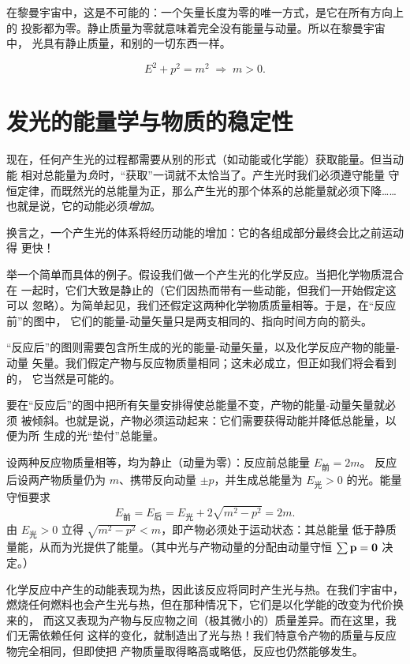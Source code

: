 在黎曼宇宙中，这是不可能的：一个矢量长度为零的唯一方式，是它在所有方向上的
投影都为零。静止质量为零就意味着完全没有能量与动量。所以在黎曼宇宙中，
光具有静止质量，和别的一切东西一样。

\begin{equation}
E^2 + p^2 = m^2 \;\Longrightarrow\; m>0 .
\end{equation}

\section{发光的能量学与物质的稳定性}

现在，任何产生光的过程都需要从别的形式（如动能或化学能）获取能量。但当动能
相对总能量为\emph{负}时，“获取”一词就不太恰当了。产生光时我们必须遵守能量
守恒定律，而既然光的总能量为正，那么产生光的那个体系的总能量就必须下降……
也就是说，它的动能必须\emph{增加}。

换言之，一个产生光的体系将经历动能的增加：它的各组成部分最终会比之前运动得
更快！


举一个简单而具体的例子。假设我们做一个产生光的化学反应。当把化学物质混合在
一起时，它们大致是静止的（它们因热而带有一些动能，但我们一开始假定这可以
忽略）。为简单起见，我们还假定这两种化学物质质量相等。于是，在“反应前”的图中，
它们的能量-动量矢量只是两支相同的、指向时间方向的箭头。

“反应后”的图则需要包含所生成的光的能量-动量矢量，以及化学反应产物的能量-动量
矢量。我们假定产物与反应物质量相同；这未必成立，但正如我们将会看到的，
它当然是可能的。

要在“反应后”的图中把所有矢量安排得使总能量不变，产物的能量-动量矢量就必须
被倾斜。也就是说，产物必须运动起来：它们需要获得动能并降低总能量，以便为所
生成的光“垫付”总能量。

\begin{notebox}[反应前后能量配平的代数]
设两种反应物质量相等，均为静止（动量为零）：反应前总能量 $E_{\text{前}} = 2m$。
反应后设两产物质量仍为 $m$、携带反向动量 $\pm p$，并生成总能量为 $E_{\text{光}}>0$
的光。能量守恒要求
\[
E_{\text{前}} = E_{\text{后}} = E_{\text{光}} + 2\sqrt{m^2 - p^2} = 2m .
\]
由 $E_{\text{光}}>0$ 立得 $\sqrt{m^2 - p^2} < m$，即产物必须处于运动状态：其总能量
低于静质量能，从而为光提供了能量。（其中光与产物动量的分配由动量守恒
$\sum \mathbf{p} = \mathbf{0}$ 决定。）
\end{notebox}

化学反应中产生的动能表现为热，因此该反应将同时产生光与热。在我们宇宙中，
燃烧任何燃料也会产生光与热，但在那种情况下，它们是以化学能的改变为代价换来的，
而这又表现为产物与反应物之间（极其微小的）质量差异。而在这里，我们无需依赖任何
这样的变化，就制造出了光与热！我们特意令产物的质量与反应物完全相同，但即使把
产物质量取得略高或略低，反应也仍然能够发生。

